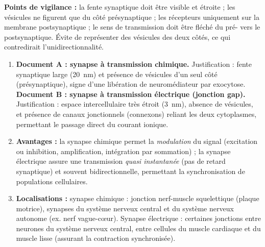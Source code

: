 \documentclass[11pt]{article}
\begin{document}
\begin{corrige}
\textbf{Points de vigilance :} la fente synaptique doit être visible et étroite ; les vésicules ne figurent que du côté présynaptique ; les récepteurs uniquement sur la membrane postsynaptique ; le sens de transmission doit être fléché du pré- vers le postsynaptique. Évite de représenter des vésicules des deux côtés, ce qui contredirait l'unidirectionnalité.
\end{corrige}

\begin{corrige}
\begin{enumerate}
\item \textbf{Document A : synapse à transmission chimique.} Justification : fente synaptique large (\SI{20}{nm}) et présence de vésicules d'un seul côté (présynaptique), signe d'une libération de neuromédiateur par exocytose.
\textbf{Document B : synapse à transmission électrique (jonction gap).} Justification : espace intercellulaire très étroit (\SI{3}{nm}), absence de vésicules, et présence de canaux jonctionnels (connexons) reliant les deux cytoplasmes, permettant le passage direct du courant ionique.
\item \textbf{Avantages :} la synapse chimique permet la \emph{modulation} du signal (excitation ou inhibition, amplification, intégration par sommation) ; la synapse électrique assure une transmission \emph{quasi instantanée} (pas de retard synaptique) et souvent bidirectionnelle, permettant la synchronisation de populations cellulaires.
\item \textbf{Localisations :} synapse chimique : jonction nerf-muscle squelettique (plaque motrice), synapses du système nerveux central et du système nerveux autonome (ex. nerf vague-cœur). Synapse électrique : certaines jonctions entre neurones du système nerveux central, entre cellules du muscle cardiaque et du muscle lisse (assurant la contraction synchronisée).
\end{enumerate}
\end{corrige}
\end{document}
